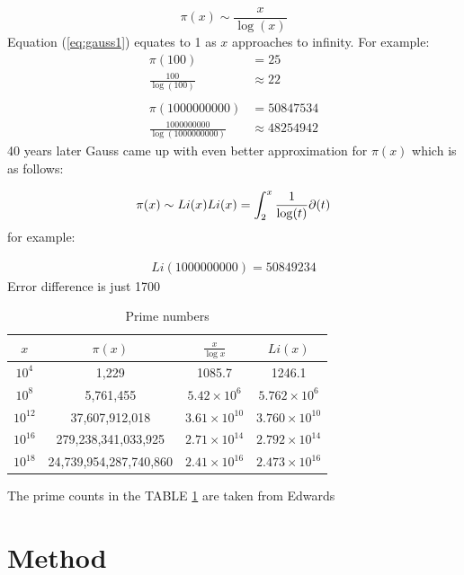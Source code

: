 \documentclass[12pt,journal,compsoc]{IEEEtran}
\begin{document}
	\begin{equation}
		\pi(x)\sim \frac{x}{\log(x)}
	\end{equation}
Equation (\ref{eq:gauss1}) equates to 1 as $x$ approaches to infinity. For example: 
	\begin{align*}
			\pi(100) &= 25 \\
			\frac{100}{\log(100)} &\approx 22 \\\\
			\pi(1000000000) &= 50847534 \\
			\frac{1000000000}{\log(1000000000)} &\approx 48254942
		\end{align*}
40 years later Gauss came up with even better approximation for $\pi(x)$ which is as follows:

	\begin{equation}
		\pi(x) \sim Li(x)\\
		Li(x)=\int_2^x\frac{1}{\log(t)}\partial(t)
	\end{equation}
for example:

\begin{align*}
		Li(1000000000) = 50849234
	\end{align*}
Error difference is just 1700

\begin{table}[ht]
	\begin{center}
	\begin{tabular}{|c|c|c|c|}
    	\hline
       		$x$	&		$\pi(x)$					&	$\frac{x}{\log x}$		&	$Li(x)$\\
	\hline
    		$10^{4}$	&	1,229					&	1085.7				&	1246.1	\\
		$10^{8}$	&	5,761,455					&	$5.42 \times 10^6$		&	$5.762 \times 10^6$	\\
		$10^{12}$	&	37,607,912,018				&	$3.61 \times 10^{10}$		&	$3.760  \times 10^{10}$		\\
		$10^{16}$	&	279,238,341,033,925		&	$2.71 \times 10^{14}$		&	$2.792 \times 10^{14}$	\\
		$10^{18}$	&	24,739,954,287,740,860		&	$2.41 \times 10^{16}$		&	$2.473 \times 10^{16}$	\\
	\hline
	\end{tabular}
	\end{center}
	\caption{Prime numbers}
	\label{table:gauss_values}

\end{table}
The prime counts in the TABLE \ref{table:gauss_values} are taken from Edwards\cite{zeta_values}


\section{{Method}}
\end{document}
